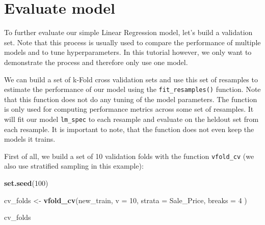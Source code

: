 \documentclass[
]{book}
\newenvironment{Shaded}{\begin{snugshade}}{\end{snugshade}}
\newcommand{\DataTypeTok}[1]{\textcolor[rgb]{0.13,0.29,0.53}{#1}}
\newcommand{\DecValTok}[1]{\textcolor[rgb]{0.00,0.00,0.81}{#1}}
\newcommand{\KeywordTok}[1]{\textcolor[rgb]{0.13,0.29,0.53}{\textbf{#1}}}
\newcommand{\NormalTok}[1]{#1}
\newcommand{\OperatorTok}[1]{\textcolor[rgb]{0.81,0.36,0.00}{\textbf{#1}}}
\newcommand{\StringTok}[1]{\textcolor[rgb]{0.31,0.60,0.02}{#1}}
\begin{document}
\begin{Shaded}
\end{Shaded}

\hypertarget{evaluate-model}{%
\chapter{Evaluate model}\label{evaluate-model}}

To further evaluate our simple Linear Regression model, let's build a validation set. Note that this process is usually used to compare the performance of multiple models and to tune hyperparameters. In this tutorial however, we only want to demonstrate the process and therefore only use one model.

We can build a set of k-Fold cross validation sets and use this set of resamples to estimate the performance of our model using the \texttt{fit\_resamples()} function. Note that this function does not do any tuning of the model parameters. The function is only used for computing performance metrics across some set of resamples. It will fit our model \texttt{lm\_spec} to each resample and evaluate on the heldout set from each resample. It is important to note, that the function does not even keep the models it trains.

First of all, we build a set of 10 validation folds with the function \texttt{vfold\_cv} (we also use stratified sampling in this example):

\begin{Shaded}
\begin{Highlighting}[]
\KeywordTok{set.seed}\NormalTok{(}\DecValTok{100}\NormalTok{)}

\NormalTok{cv\_folds \textless{}{-}}
\StringTok{  }\KeywordTok{vfold\_cv}\NormalTok{(new\_train,}
    \DataTypeTok{v =} \DecValTok{10}\NormalTok{,}
    \DataTypeTok{strata =}\NormalTok{ Sale\_Price,}
    \DataTypeTok{breaks =} \DecValTok{4}
\NormalTok{  )}

\NormalTok{cv\_folds}
\end{Highlighting}
\end{Shaded}
\end{document}
